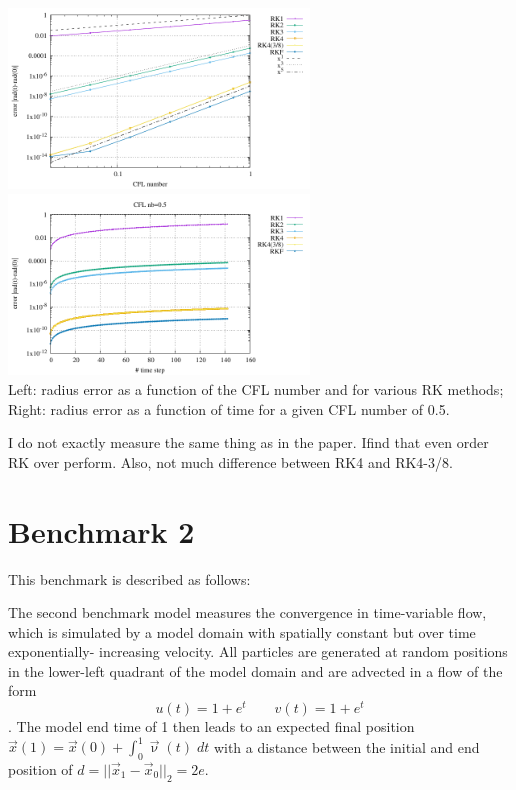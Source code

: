 \begin{center}
\includegraphics[width=8cm]{python_codes/fieldstone_122/results/exp1/errors.pdf}
\includegraphics[width=8cm]{python_codes/fieldstone_122/results/exp1/rad.pdf}\\
{\captionfont Left: radius error as a function of the CFL number and for various RK methods;
Right: radius error as a function of time for a given CFL number of 0.5.}
\end{center}

I do not exactly measure the same thing as in the paper. 
Ifind that even order RK over perform. Also, not much difference between RK4 and RK4-3/8.

\section*{Benchmark 2}

This benchmark is described as follows:
\begin{displayquote}
The second benchmark model measures the convergence
in time-variable flow, which is simulated by a model domain 
with spatially constant but over time exponentially-
increasing velocity. All particles are generated at random
positions in the lower-left quadrant of the model domain
and are advected in a flow of the form
\[
u(t)=1 + e^t \qquad 
v(t)=1 + e^t 
\].
The model end time
of 1 then leads to an expected final
position $\vec{x}(1) = \vec{x}(0) + \int_0^1 \vec\upnu(t) \; dt$
 with a distance between the initial and end position of $d = ||\vec{x}_1-\vec{x}_0 ||_2 = 2e$.
\end{displayquote}








